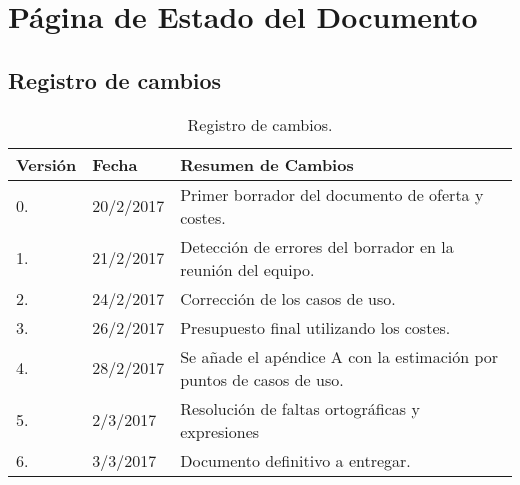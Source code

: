 \section*{Página de Estado del Documento}

\subsection*{Registro de cambios}
\begin{table}[htbp]
\begin{center}
\begin{tabular}{l l p{11cm} }
\textbf{Versión}&\textbf{Fecha}&\textbf{Resumen de Cambios}\\
\hline \hline
0.&20/2/2017&Primer borrador del documento de oferta y costes.\\
\hline
1.&21/2/2017&Detección de errores del borrador en la reunión del equipo.\\
\hline
2.&24/2/2017&Corrección de los casos de uso.\\
\hline
3.&26/2/2017&Presupuesto final utilizando los costes.\\
\hline
4.&28/2/2017&Se añade el apéndice A con la estimación por puntos de casos de uso.\\
\hline
5.&2/3/2017&Resolución de faltas ortográficas y expresiones\\
\hline
6.&3/3/2017&Documento definitivo a entregar.\\
\hline
\end{tabular}
\caption{Registro de cambios.}
\label{tabla:changeReg}
\end{center}
\end{table}
